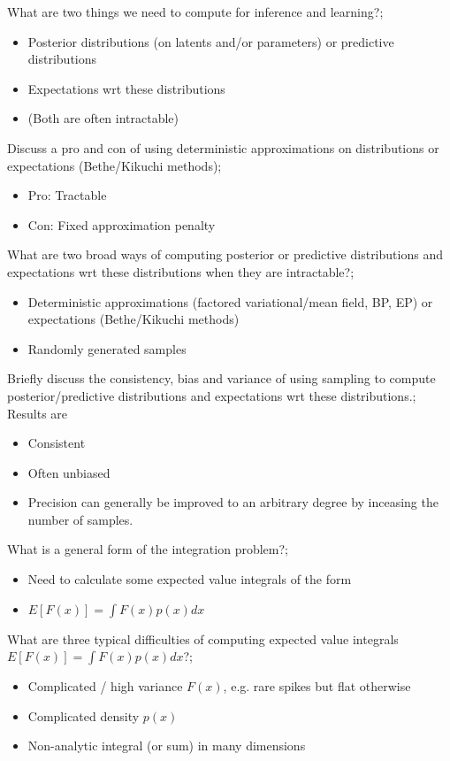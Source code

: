\documentclass{article}
\begin{document}
What are two things we need to compute for inference and learning?; \begin{itemize} \item Posterior distributions (on latents and/or parameters) or predictive distributions \item Expectations wrt these distributions \item (Both are often intractable) \end{itemize}

Discuss a pro and con of using deterministic approximations on distributions or expectations (Bethe/Kikuchi methods); \begin{itemize} \item Pro: Tractable \item Con: Fixed approximation penalty \end{itemize}

What are two broad ways of computing posterior or predictive distributions and expectations wrt these distributions when they are intractable?; \begin{itemize} \item Deterministic approximations (factored variational/mean field, BP, EP) or expectations (Bethe/Kikuchi methods) \item Randomly generated samples \end{itemize}

Briefly discuss the consistency, bias and variance of using sampling to compute posterior/predictive distributions and expectations wrt these distributions.; Results are \begin{itemize} \item Consistent \item Often unbiased \item Precision can generally be improved to an arbitrary degree by inceasing the number of samples. \end{itemize}


What is a general form of the integration problem?; \begin{itemize} \item Need to calculate some expected value integrals of the form \item $E[F(x)] = \int F(x)p(x)dx$ \end{itemize}

What are three typical difficulties of computing expected value integrals $E[F(x)] = \int F(x)p(x)dx$?; \begin{itemize} \item Complicated / high variance $F(x)$, e.g. rare spikes but flat otherwise \item Complicated density $p(x)$ \item Non-analytic integral (or sum) in many dimensions \end{itemize} 
\end{document}
